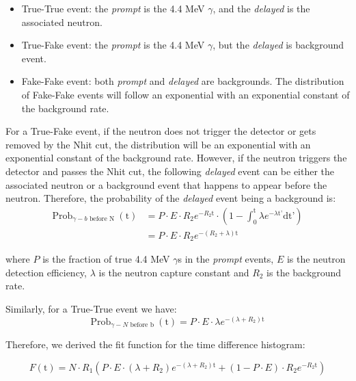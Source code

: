 \documentclass[a4paper]{jpconf}
\begin{document}
\begin{itemize}
\item True-True event: the \textit{prompt} is the 4.4 MeV $\gamma$, and the \textit{delayed} is the associated neutron. 
\item True-Fake event: the \textit{prompt} is the 4.4 MeV $\gamma$, but the \textit{delayed} is background event.
\item Fake-Fake event: both \textit{prompt} and \textit{delayed} are backgrounds. The distribution of Fake-Fake events will follow an exponential with an exponential constant of the background rate.
\end{itemize}

For a True-Fake event, if the neutron does not trigger the detector or gets removed by the Nhit cut, the distribution will be an exponential with an exponential constant of the background rate. However, if the neutron triggers the detector and passes the Nhit cut, the following \textit{delayed} event can be either the associated neutron or a background event that happens to appear before the neutron. Therefore, the probability of the \textit{delayed} event being a background is:
\begin{equation}
\begin{aligned}
\textrm{Prob}_{\gamma - b\textrm{ before N }}(\textrm{t}) & = P \cdot E \cdot R_{2} e^{-R_{2}\textrm{t}} \cdot (1- \int_0^{\textrm{t}} \lambda e^{-\lambda \textrm{t'}}\textrm{dt'}) \\
& = P \cdot E \cdot R_{2} e^{-(R_{2}+\lambda)\textrm{t}}
\end{aligned}
\end{equation}

where $P$ is the fraction of true 4.4 MeV $\gamma$s in the \textit{prompt} events, $E$ is the neutron detection efficiency, $\lambda$ is the neutron capture constant and $R_2$ is the background rate.

Similarly, for a True-True event we have:
\begin{equation}
\textrm{Prob}_{\gamma - N\textrm{ before b }}(\textrm{t}) = P \cdot E \cdot \lambda e^{-(\lambda+R_{2})\textrm{t}}
\end{equation}

Therefore, we derived the fit function for the time difference histogram:

\begin{equation}
F(\textrm{t}) = N \cdot R_{1} (P \cdot E \cdot (\lambda+R_{2}) e^{-(\lambda+R_{2}) \textrm{t}} + (1-P \cdot E) \cdot R_{2} e^{-R_{2} \textrm{t}})
\end{equation}
\end{document}
